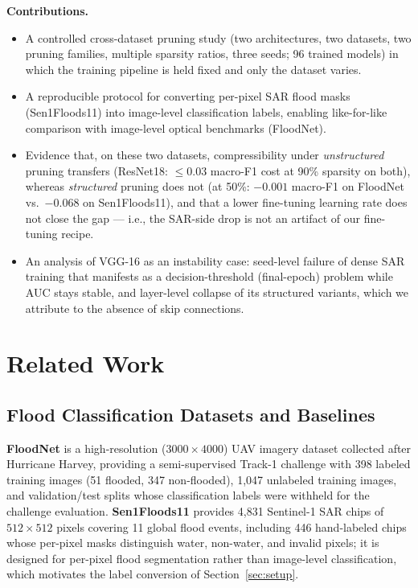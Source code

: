 \documentclass[conference]{IEEEtran}
\newif\ifreview
\newcommand{\REV}[1]{\ifreview\textcolor{red}{\textbf{[Revise: #1]}}\fi}
\begin{document}
\noindent\textbf{Contributions.}
\begin{itemize}
\item A controlled cross-dataset pruning study (two architectures, two
datasets, two pruning families, multiple sparsity ratios, three seeds;
96 trained models) in which the training pipeline is held fixed and
only the dataset varies.
\item A reproducible protocol for converting per-pixel SAR flood masks
(Sen1Floods11) into image-level classification labels, enabling
like-for-like comparison with image-level optical benchmarks
(FloodNet).
\item Evidence that, on these two datasets, compressibility under
\emph{unstructured} pruning transfers (ResNet18: $\leq 0.03$ macro-F1
cost at 90\% sparsity on both), whereas \emph{structured} pruning does
not (at 50\%: $-0.001$ macro-F1 on FloodNet vs.\ $-0.068$ on
Sen1Floods11), and that a lower fine-tuning learning rate does not
close the gap --- i.e., the SAR-side drop is not an artifact of our
fine-tuning recipe.
\item An analysis of VGG-16 as an instability case: seed-level failure
of dense SAR training that manifests as a decision-threshold
(final-epoch) problem while AUC stays stable, and layer-level collapse
of its structured variants, which we attribute to the absence of skip
connections.
\end{itemize}
\REV{[A2/A12] Update numbers here after recomputing (0.067 vs 0.068).
Contribution 3: ``not an artifact of our fine-tuning recipe'' is too
strong with only lr $0.001$, 2 seeds, plain SGD (see B4). Contribution
4: ``which we attribute to'' $\rightarrow$ ``which we hypothesize is
due to'' unless you add a layer-wise test (B7). Do not claim
``reproducible protocol'' unless the code and split files are released
(A9).}

\section{Related Work}
\subsection{Flood Classification Datasets and Baselines}
\textbf{FloodNet} \cite{rahnemoonfar2021floodnet} is a high-resolution
($3000\times4000$) UAV imagery dataset collected after Hurricane
Harvey, providing a semi-supervised Track-1 challenge with 398 labeled
training images (51 flooded, 347 non-flooded), 1{,}047 unlabeled
training images, and validation/test splits whose classification
labels were withheld for the challenge evaluation.
\textbf{Sen1Floods11} \cite{bonafilia2020sen1floods11} provides 4{,}831
Sentinel-1 SAR chips of $512\times512$ pixels covering 11 global flood
events, including 446 hand-labeled chips whose per-pixel masks
distinguish water, non-water, and invalid pixels; it is designed for
per-pixel flood segmentation rather than image-level classification,
which motivates the label conversion of Section~\ref{sec:setup}.
\end{document}
